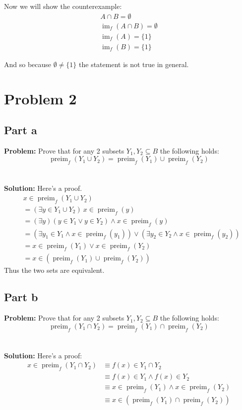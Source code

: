\documentclass{article}
\begin{document}
Now we will show the counterexample:
\begin{gather*}
  A\cap B=\emptyset\\
  \operatorname{im}_f(A\cap B)=\emptyset\\
  \operatorname{im}_f(A)=\{1\}\\
  \operatorname{im}_f(B)=\{1\}
\end{gather*}

And so because $\emptyset\not=\{1\}$ the statement is not true in general.

\section*{Problem 2}
\subsection*{Part a}
\textbf{Problem:} Prove that for any 2 subsets $Y_1,Y_2\subseteq B$ the following holds:
$$\operatorname{preim}_f(Y_1\cup Y_2)=\operatorname{preim}_f(Y_1)\cup\operatorname{preim}_f(Y_2)$$
\\\\
\textbf{Solution:} Here's a proof.
\begin{align*}
  &x\in\operatorname{preim}_f(Y_1\cup Y_2)\\
  &=(\exists y\in Y_1\cup Y_2)\ x\in\operatorname{preim}_f(y)\tag{def. of preimage of a set}\\
  &=(\exists y)(y\in Y_1\vee y\in Y_2)\wedge x\in\operatorname{preim}_f(y)\tag{def. of set union}\\
  &=(\exists y_1\in Y_1\wedge x\in\operatorname{preim}_f(y_1))\vee (\exists y_2\in Y_2\wedge x\in\operatorname{preim}_f(y_2)) \tag{distr. $\wedge$}\\
  &=x\in\operatorname{preim}_f(Y_1)\vee x\in\operatorname{preim}_f(Y_2)\tag{def. of preimage of a set}\\
  &=x\in(\operatorname{preim}_f(Y_1)\cup\operatorname{preim}_f(Y_2))\tag{def. of set union}
\end{align*}
Thus the two sets are equivalent.

\subsection*{Part b}
\textbf{Problem:} Prove that for any 2 subsets $Y_1,Y_2\subseteq B$ the following holds:
$$\operatorname{preim}_f(Y_1\cap Y_2)=\operatorname{preim}_f(Y_1)\cap\operatorname{preim}_f(Y_2)$$
\\\\
\textbf{Solution:} Here's a proof:
\begin{align*}
  x\in\operatorname{preim}_f(Y_1\cap Y_2)&\equiv f(x)\in Y_1\cap Y_2\\
  &\equiv f(x)\in Y_1\wedge f(x)\in Y_2\\
  &\equiv x\in\operatorname{preim}_f(Y_1)\wedge x\in\operatorname{preim}_f(Y_2)\\
  &\equiv x\in(\operatorname{preim}_f(Y_1)\cap\operatorname{preim}_f(Y_2))\\
\end{align*}
\end{document}
